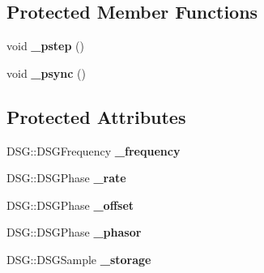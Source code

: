 \subsection*{Protected Member Functions}
\begin{DoxyCompactItemize}
\item 
\hypertarget{class_d_s_g_1_1_signal_generator_a513b244d068bd0a42f79845ae0874e0f}{void {\bfseries \+\_\+pstep} ()}\label{class_d_s_g_1_1_signal_generator_a513b244d068bd0a42f79845ae0874e0f}

\item 
\hypertarget{class_d_s_g_1_1_signal_generator_a05baccb38d1e52860d4fcf7cb8430efc}{void {\bfseries \+\_\+psync} ()}\label{class_d_s_g_1_1_signal_generator_a05baccb38d1e52860d4fcf7cb8430efc}

\end{DoxyCompactItemize}
\subsection*{Protected Attributes}
\begin{DoxyCompactItemize}
\item 
\hypertarget{class_d_s_g_1_1_signal_generator_a335e7ef058848eca368be51d8544d143}{D\+S\+G\+::\+D\+S\+G\+Frequency {\bfseries \+\_\+frequency}}\label{class_d_s_g_1_1_signal_generator_a335e7ef058848eca368be51d8544d143}

\item 
\hypertarget{class_d_s_g_1_1_signal_generator_aa8a7e9cda2b0c94484477e8ee3d680e0}{D\+S\+G\+::\+D\+S\+G\+Phase {\bfseries \+\_\+rate}}\label{class_d_s_g_1_1_signal_generator_aa8a7e9cda2b0c94484477e8ee3d680e0}

\item 
\hypertarget{class_d_s_g_1_1_signal_generator_a12850f2c05838e2234602bd4fde87732}{D\+S\+G\+::\+D\+S\+G\+Phase {\bfseries \+\_\+offset}}\label{class_d_s_g_1_1_signal_generator_a12850f2c05838e2234602bd4fde87732}

\item 
\hypertarget{class_d_s_g_1_1_signal_generator_a1e23eb94e204b11db75fca030b951065}{D\+S\+G\+::\+D\+S\+G\+Phase {\bfseries \+\_\+phasor}}\label{class_d_s_g_1_1_signal_generator_a1e23eb94e204b11db75fca030b951065}

\item 
\hypertarget{class_d_s_g_1_1_signal_generator_a28a9b47a1aa0783029f11a19ba0363f2}{D\+S\+G\+::\+D\+S\+G\+Sample {\bfseries \+\_\+storage}}\label{class_d_s_g_1_1_signal_generator_a28a9b47a1aa0783029f11a19ba0363f2}

\end{DoxyCompactItemize}


